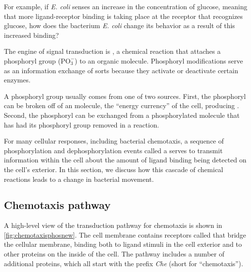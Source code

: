 For example, if \textit{E. coli} senses an increase in the concentration of glucose, meaning that more ligand-receptor binding is taking place at the receptor that recognizes glucose, how does the bacterium \textit{E. coli} change its behavior as a result of this increased binding?

The engine of signal transduction is , a chemical reaction that attaches a phosphoryl group ($\text{PO}_3^{-}$) to an organic molecule.  Phosphoryl modifications serve as an information exchange of sorts because they activate or deactivate certain enzymes.

A phosphoryl group usually comes from one of two sources. First, the phosphoryl can be broken off of an  molecule, the ``energy currency'' of the cell, producing . Second, the phosphoryl can be exchanged from a phosphorylated molecule that has had its phosphoryl group removed in a  reaction.

For many cellular responses, including bacterial chemotaxis, a sequence of phosphorylation and dephosphorylation events called a  serves to transmit information within the cell about the amount of ligand binding being detected on the cell's exterior. In this section, we discuss how this cascade of chemical reactions leads to a change in bacterial movement.

\FloatBarrier
{}
\subsection{Chemotaxis pathway}

A high-level view of the transduction pathway for chemotaxis is shown in \autoref{fig:chemotaxisphosnew}. The cell membrane contains receptors called  that bridge the cellular membrane, binding both to ligand stimuli in the cell exterior and to other proteins on the inside of the cell. The pathway includes a number of additional proteins, which all start with the prefix \textit{Che} (short for ``chemotaxis'').

